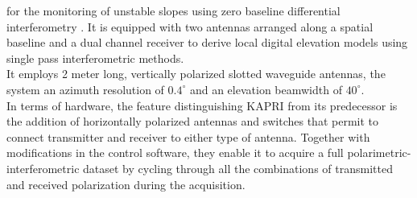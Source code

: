 for the monitoring of unstable slopes using zero baseline differential interferometry \cite{Massonnet1993,JGRB:JGRB7093}. It is equipped with two antennas arranged along a spatial baseline and a dual channel receiver to derive local digital elevation models using single pass interferometric methods.\\
It employs  2 meter long, vertically polarized slotted waveguide antennas, the system an azimuth resolution of $0.4^\circ$ and an elevation beamwidth of $40^\circ$.\\
In terms of hardware, the feature distinguishing KAPRI from its predecessor is the addition of horizontally polarized antennas and switches that permit to connect transmitter and receiver to either type of antenna. Together with modifications in the control software, they enable it to acquire a full polarimetric-interferometric dataset by cycling through all the combinations of transmitted and received polarization during the acquisition.
